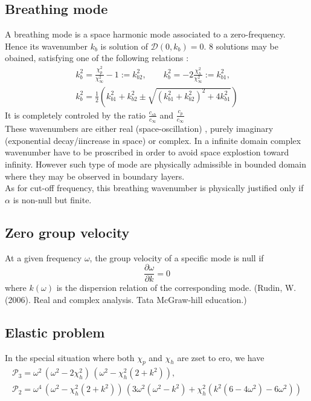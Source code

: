 \documentclass[
10pt, %
a4paper, %
oneside, %
headinclude,footinclude, %
table
]{scrartcl}
\begin{document}
\subsection{Breathing mode}
A breathing mode is a space harmonic mode associated to a zero-frequency. Hence its wavenumber $k_{b}$ is solution of $\mathcal{D}(0,k_{b})=0$. 8 solutions may be obained, satisfying one of the following relations :
$$
\begin{array}{c}
k^2_{b}=\frac{\chi_{p}^2}{\chi_{\infty}^2}-1:=k^2_{b2}, \quad\quad
k^2_{b}=-2\frac{\chi_{h}^2}{\chi_{\infty}^2}:=k^2_{b1}, \\[8pt]
k^2_{b}=\frac{1}{2}\left(k^2_{b1}+k^2_{b2}\pm \sqrt{(k^2_{b1}+k^2_{b2})^2+4k^2_{b1}}\right)
\end{array}
$$
It is completely controled by the ratio $\frac{c_{sh}}{c_{\infty}}$ and $\frac{c_{p}}{c_{\infty}}$\\
These wavenumbers are either real (space-oscillation) , purely imaginary (exponential decay/iincrease in space) or complex. In a infinite domain complex wavenumber have to be proscribed in order to avoid space explostion toward infinity. However such type of mode are physically admissible in bounded domain where they may be observed in boundary layers.  \\
As for cut-off frequency, this breathing wavenumber is physically justified only if $\alpha$ is non-null but finite. 

\subsection{Zero group velocity}
At a given frequency $\omega$, the group velocity of a specific mode is null if 
$$
\frac{\partial \omega}{\partial k}=0
$$
where $k(\omega)$ is the dispersion relation of the corresponding mode. (Rudin, W. (2006). Real and complex analysis. Tata McGraw-hill education.)
\subsection{Elastic problem}

In the special situation where both $\chi_{p}$ and $\chi_{h}$ are zset to ero, we have
$$
\begin{array}{c}
\mathcal{P}_{3}=\omega^2\, \left(\omega^2-2\chi_{h}^2\right)\, \left(\omega^2-\chi_{h}^2(2+k^2)\right), \\[6pt]
\mathcal{P}_{2}=\omega^4 \, \left(\omega^2-\chi_{h}^2(2+k^2)\right) \, \left( 
 3 \omega^2(\omega^2 - k^2)+ \chi_{h}^2( k^2 (6 - 4 \omega^2)-6 \omega^2)  \right)
 \end{array}
$$
\end{document}

